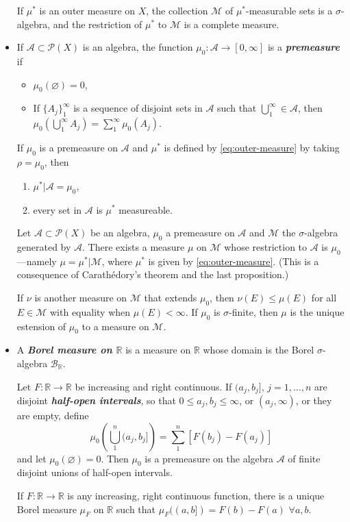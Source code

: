 \documentclass{article}
\theoremstyle{definition}
\newcommand{\R}{\mathbb{R}}
\begin{document}
\begin{itemize}
		\begin{thm}[Carathèodory]
			If $\mu^*$ is an outer measure on $X$, the collection $\mathcal{M}$ of $\mu^*$-measurable sets is a $\sigma$-algebra, and the restriction of $\mu^*$ to $\mathcal{M}$ is a complete measure.
		\end{thm}
		\item If $\mathcal{A}\subset\mathcal{P}(X)$ is an algebra, the function $\mu_0:\mathcal{A}\to[0,\infty]$ is a \textbf{\textit{premeasure}} if
		\begin{itemize}
			\item $\mu_0(\varnothing)=0$,
			\item If $\{A_j\}_1^\infty$ is a sequence of disjoint sets in $\mathcal{A}$ such that $\bigcup_1^\infty\in\mathcal{A}$, then $\mu_0\left(\bigcup_{1}^\infty A_j\right)=\sum_1^\infty\mu_0(A_j)$.
		\end{itemize}
		\begin{prop}
			If $\mu_0$ is a premeasure on $\mathcal{A}$ and $\mu^*$ is defined by \cref{eq:outer-measure} by taking $\rho=\mu_0$, then
			\begin{enumerate}
				\item $\mu^*|\mathcal{A}=\mu_0$,
				\item every set in $\mathcal{A}$ is $\mu^*$ measureable.
			\end{enumerate}
		\end{prop}
		\begin{thm}\label{thm:1.8}
			Let $\mathcal{A}\subset\mathcal{P}(X)$ be an algebra, $\mu_0$ a premeasure on $\mathcal{A}$ and $\mathcal{M}$ the $\sigma$-algebra generated by $\mathcal{A}$. There exists a measure $\mu$ on $\mathcal{M}$ whose restriction to $\mathcal{A}$ is $\mu_0$---namely $\mu=\mu^*|\mathcal{M}$, where $\mu^*$ is given by \cref{eq:outer-measure}. (This is a consequence of Carathédory's theorem and the last proposition.)
			
			If $\nu$ is another measure on $\mathcal{M}$ that extends $\mu_0$, then $\nu(E)\leq\mu(E)$ for all $E\in\mathcal{M}$ with equality when $\mu(E)<\infty$. If $\mu_0$ is $\sigma$-finite, then $\mu$ is the unique estension of $\mu_0$ to a measure on $\mathcal{M}$.
		\end{thm}
		\item A \textbf{\textit{Borel measure on $\R$}} is a measure on $\R$ whose domain is the Borel $\sigma$-algebra $\mathcal{B}_\R$.
		\begin{prop}
			Let $F:\R\to\R$ be increasing and right continuous. If $(a_j,b_j]$, $j=1,\ldots,n$ are disjoint \textbf{\textit{half-open intervals}}, so that $0\leq a_j,b_j\leq\infty$, or $(a_j,\infty)$, or they are empty, define
			\[\mu_0\left(\bigcup_{1}^n(a_j,b_j]\right)=\sum_1^n[F(b_j)-F(a_j)]\]
			and let $\mu_0(\varnothing)=0$. Then $\mu_0$ is a premeasure on the algebra $\mathcal{A}$ of finite disjoint unions of half-open intervals.
		\end{prop}
		\begin{thm}
			If $F:\R\to\R$ is any increasing, right continuous function, there is a unique Borel measure $\mu_F$ on $\R$ such that $\mu_F((a,b])=F(b)-F(a)$ $\forall a,b$.
			

\end{thm}
\end{itemize}
\end{document}
